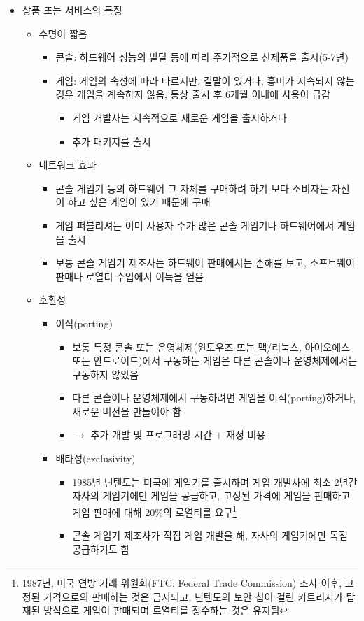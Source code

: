 \begin{itemize}
	
\item 상품 또는 서비스의 특징
	\begin{itemize}
	\item 수명이 짧음
		\begin{itemize}
		\item 콘솔: 하드웨어 성능의 발달 등에 따라 주기적으로 신제품을 출시(5-7년)		
		\item 게임: 게임의 속성에 따라 다르지만, 결말이 있거나, 흥미가 지속되지 않는 경우 게임을 계속하지 않음, 통상 출시 후 6개월 이내에 사용이 급감
			\begin{itemize}
			\item 게임 개발사는 지속적으로 새로운 게임을 출시하거나
			\item 추가 패키지를 출시
			\end{itemize}
		\end{itemize}
	\item 네트워크 효과
		\begin{itemize}
		\item 콘솔 게임기 등의 하드웨어 그 자체를 구매하려 하기 보다 소비자는 자신이 하고 싶은 게임이 있기 때문에 구매
		\item 게임 퍼블리셔는 이미 사용자 수가 많은 콘솔 게임기나 하드웨어에서 게임을 출시
		\item 보통 콘솔 게임기 제조사는 하드웨어 판매에서는 손해를 보고, 소프트웨어 판매나 로열티 수입에서 이득을 얻음
		\end{itemize}
	\item 호환성
		\begin{itemize}
		\item 이식(porting)
			\begin{itemize}
			\item 보통 특정 콘솔 또는 운영체제(윈도우즈 또는 맥/리눅스, 아이오에스 또는 안드로이드)에서 구동하는 게임은 다른 콘솔이나 운영체제에서는 구동하지 않았음
			\item 다른 콘솔이나 운영체제에서 구동하려면 게임을 이식(porting)하거나, 새로운 버전을 만들어야 함
			\item $\rightarrow$ 추가 개발 및 프로그래밍 시간 $+$ 재정 비용
			\end{itemize}
		\item 배타성(exclusivity)
			\begin{itemize}
			\item 1985년 닌텐도는 미국에 게임기를 출시하며 게임 개발사에 최소 2년간 자사의 게임기에만 게임을 공급하고, 고정된 가격에 게임을 판매하고 게임 판매에 대해 20\%의 로열티를 요구\footnote{1987년, 미국 연방 거래 위원회(FTC: Federal Trade Commission) 조사 이후, 고정된 가격으로의 판매하는 것은 금지되고, 닌텐도의 보안 칩이 걸린 카트리지가 탑재된 방식으로 게임이 판매되며 로열티를 징수하는 것은 유지됨}
			\item 콘솔 게임기 제조사가 직접 게임 개발을 해, 자사의 게임기에만 독점 공급하기도 함
			\end{itemize}
		\end{itemize}
	\end{itemize}		
\end{itemize}


